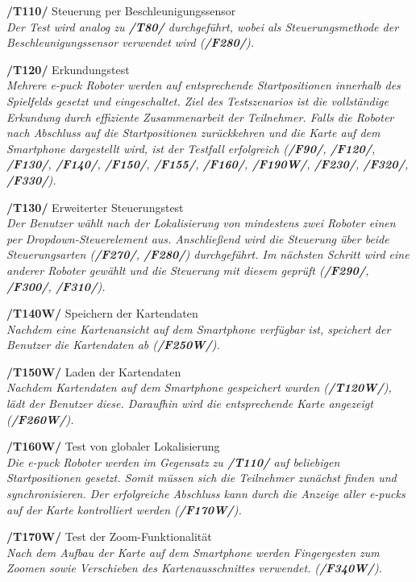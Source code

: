 \documentclass[10pt,a4paper]{article}
\begin{document}
\begin{list}{}{\leftmargin=1cm}
				\item[\textbf{/T110/}] Steuerung per Beschleunigungssensor
					\\ \textsl{Der Test wird analog zu \textbf{/T80/} durchgeführt, wobei als Steuerungsmethode der Beschleunigungssensor
						verwendet wird (\textbf{/F280/}).}
				\item[\textbf{/T120/}] Erkundungstest
					\\ \textsl{Mehrere e-puck Roboter werden auf entsprechende Startpositionen innerhalb des Spielfelds gesetzt und
						eingeschaltet. Ziel des Testszenarios ist die vollständige Erkundung durch effiziente Zusammenarbeit der Teilnehmer.
						Falls die Roboter nach Abschluss auf die Startpositionen zurückkehren und die Karte auf dem Smartphone dargestellt
						wird, ist der Testfall erfolgreich (\textbf{/F90/}, \textbf{/F120/}, \textbf{/F130/}, \textbf{/F140/}, \textbf{/F150/},
						\textbf{/F155/}, \textbf{/F160/}, \textbf{/F190W/}, \textbf{/F230/}, \textbf{/F320/}, \textbf{/F330/}).}
				\item[\textbf{/T130/}] Erweiterter Steuerungstest
					\\ \textsl{Der Benutzer wählt nach der Lokalisierung von mindestens zwei Roboter einen per Dropdown-Steuerelement aus.
						Anschließend wird die Steuerung über beide Steuerungsarten (\textbf{/F270/}, \textbf{/F280/}) durchgeführt. Im nächsten
						Schritt wird eine anderer Roboter gewählt und die Steuerung mit diesem geprüft (\textbf{/F290/}, \textbf{/F300/},
						\textbf{/F310/}).}
				\item[\textbf{/T140W/}] Speichern der Kartendaten
					\\ \textsl{Nachdem eine Kartenansicht auf dem Smartphone verfügbar ist, speichert der Benutzer die Kartendaten ab
						(\textbf{/F250W/}).}
				\item[\textbf{/T150W/}] Laden der Kartendaten
					\\ \textsl{Nachdem Kartendaten auf dem Smartphone gespeichert wurden (\textbf{/T120W/}), lädt der Benutzer diese.
						Daraufhin wird die entsprechende Karte angezeigt (\textbf{/F260W/}).}						
				\item[\textbf{/T160W/}] Test von globaler Lokalisierung
					\\ \textsl{Die e-puck Roboter werden im Gegensatz zu \textbf{/T110/} auf beliebigen Startpositionen gesetzt. Somit müssen
						sich die Teilnehmer zunächst finden und synchronisieren. Der erfolgreiche Abschluss kann durch die Anzeige aller e-pucks
						auf der Karte kontrolliert werden (\textbf{/F170W/}).}		
				\item[\textbf{/T170W/}] Test der Zoom-Funktionalität
					\\ \textsl{Nach dem Aufbau der Karte auf dem Smartphone werden Fingergesten zum Zoomen sowie Verschieben des
						Kartenausschnittes verwendet. (\textbf{/F340W/}).}																						
			\end{list} 
			
	\newpage	
	\printglossary[style=altlist,title=Glossar]
						
\end{document}
